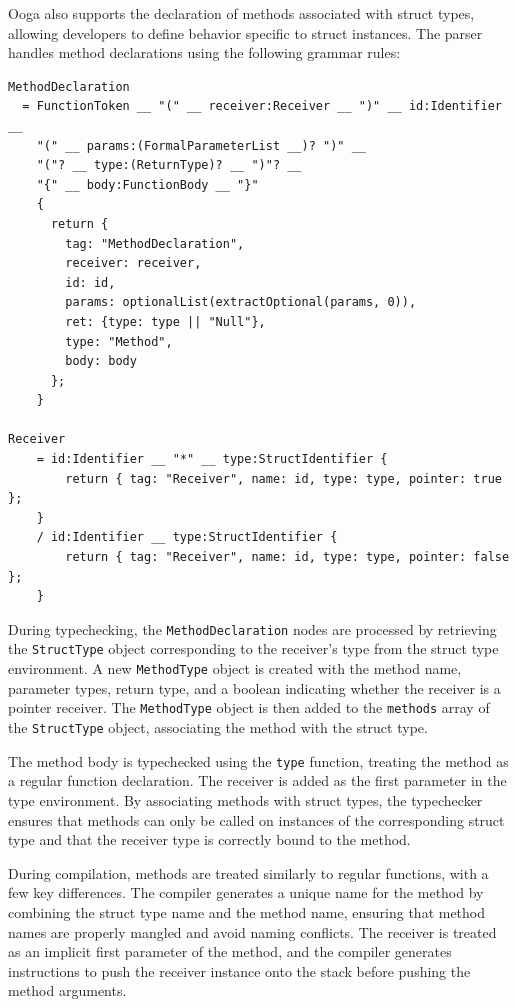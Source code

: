 \documentclass{report}
\begin{document}
Ooga also supports the declaration of methods associated with struct types, allowing developers to define behavior specific to struct instances. The parser handles method declarations using the following grammar rules:

\begin{verbatim}
MethodDeclaration
  = FunctionToken __ "(" __ receiver:Receiver __ ")" __ id:Identifier __
    "(" __ params:(FormalParameterList __)? ")" __
    "("? __ type:(ReturnType)? __ ")"? __
    "{" __ body:FunctionBody __ "}"
    {
      return {
        tag: "MethodDeclaration",
        receiver: receiver,
        id: id,
        params: optionalList(extractOptional(params, 0)),
        ret: {type: type || "Null"},
        type: "Method",
        body: body
      };
    }

Receiver
    = id:Identifier __ "*" __ type:StructIdentifier {
        return { tag: "Receiver", name: id, type: type, pointer: true };
    }
    / id:Identifier __ type:StructIdentifier {
        return { tag: "Receiver", name: id, type: type, pointer: false };
    }
\end{verbatim}

During typechecking, the \texttt{MethodDeclaration} nodes are processed by retrieving the \texttt{StructType} object corresponding to the receiver's type from the struct type environment. A new \texttt{MethodType} object is created with the method name, parameter types, return type, and a boolean indicating whether the receiver is a pointer receiver. The \texttt{MethodType} object is then added to the \texttt{methods} array of the \texttt{StructType} object, associating the method with the struct type.

The method body is typechecked using the \texttt{type} function, treating the method as a regular function declaration. The receiver is added as the first parameter in the type environment. By associating methods with struct types, the typechecker ensures that methods can only be called on instances of the corresponding struct type and that the receiver type is correctly bound to the method.

During compilation, methods are treated similarly to regular functions, with a few key differences. The compiler generates a unique name for the method by combining the struct type name and the method name, ensuring that method names are properly mangled and avoid naming conflicts. The receiver is treated as an implicit first parameter of the method, and the compiler generates instructions to push the receiver instance onto the stack before pushing the method arguments.
\end{document}
